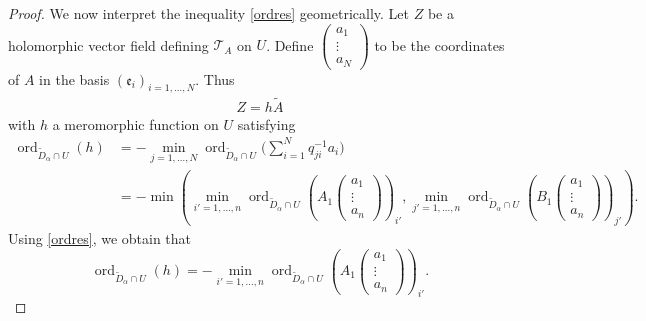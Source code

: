 \documentclass[10pt,a4paper]{amsart}
\numberwithin{equation}{section}
\begin{document}
\begin{proof}
We now interpret the inequality \eqref{ordres} geometrically. Let $Z$ be a holomorphic vector field defining $\mathcal{T}_A$ on $U$. Define $\left(\begin{smallmatrix}a_1\\ \vdots \\a_N\end{smallmatrix}\right)$ to be the coordinates of $A$ in the basis $(\mathfrak{e}_i)_{i=1,\dots,N}$. Thus
 \begin{gather*}%
 Z= h \tilde{A} \end{gather*}
 with $h$ a meromorphic function on $U$ satisfying
 \begin{align*} \operatorname{ord}_{\tilde{D}_\alpha \cap U} (h)&{}= - \min_{j=1,\dots,N} \operatorname{ord}_{\tilde{D}_\alpha \cap U}\Bigg(\sum_{i=1}^{N} q^{-1}_{ji} a_i\Bigg)\\
 &= -\min\left(\min_{i'=1,\dots,n} \operatorname{ord}_{\tilde{D}_\alpha \cap U}\left(\!A_1 \begin{pmatrix} a_1 \\ \vdots \\ a_n \end{pmatrix}\right)_{i'}, \min_{j'=1,\dots,n} \operatorname{ord}_{\tilde{D}_\alpha \cap U} \left(\!B_1 \begin{pmatrix} a_1 \\ \vdots \\ a_n \end{pmatrix}\right)_{j'}\right).
 \end{align*}
Using \eqref{ordres}, we obtain that
\[\operatorname{ord}_{\tilde{D}_\alpha\cap U}(h) = - \min_{i'=1,\dots,n} \operatorname{ord}_{\tilde{D}_\alpha \cap U}\left(A_1 \left(\begin{matrix} a_1 \\ \vdots \\ a_n \end{matrix}\right)\right)_{i'}.\]


\end{proof}
\end{document}
